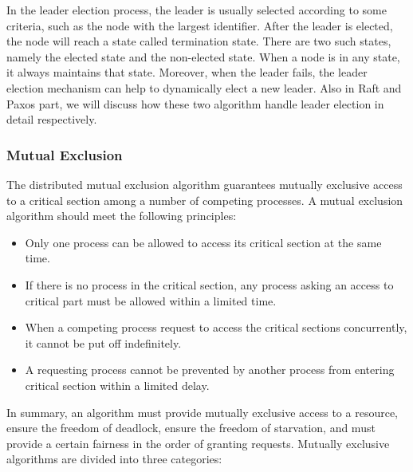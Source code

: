 \documentclass[12pt, a4paper]{article}
\begin{document}
In the leader election process, the leader is usually selected according to 
some criteria, such as the node with the largest identifier\cite{effatparvar2010improved}. After the leader is elected, the node will reach a state called termination state. There are two such states, namely the elected state and the non-elected state. When a node is in any state, it always maintains that state. Moreover, when the leader fails, the leader election mechanism can help to dynamically elect a new leader. Also in Raft and Paxos part, we will discuss how these two algorithm handle leader election in detail respectively.

\subsubsection{Mutual Exclusion}

The distributed mutual exclusion algorithm guarantees mutually exclusive access 
to a critical section among a number of competing 
processes\cite{lamport1987fast}. A mutual exclusion algorithm should meet the 
following principles\cite{velazques1993survey}: 

\begin{itemize}
  \item \textbf{}Only one process can be allowed to access its critical 
  section at the same time.
  \item \textbf{}If there is no process in the critical section, any 
  process asking an access to critical part must be allowed within a limited 
  time. 
  \item \textbf{}When a competing process request to access the critical 
  sections concurrently, it cannot be put off indefinitely.
  \item \textbf{}A requesting process cannot be prevented by another process 
  from entering critical section within a limited delay. 
\end{itemize}

In summary, an algorithm must provide mutually exclusive access to a resource, 
ensure the freedom of deadlock, ensure the freedom of starvation, and must 
provide a certain fairness in the order of granting requests. Mutually exclusive 
algorithms are divided into three categories:
\end{document}

